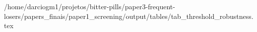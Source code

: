 /home/darciogm1/projetos/bitter-pills/paper3-frequent-losers/papers_finais/paper1_screening/output/tables/tab_threshold_robustness.tex